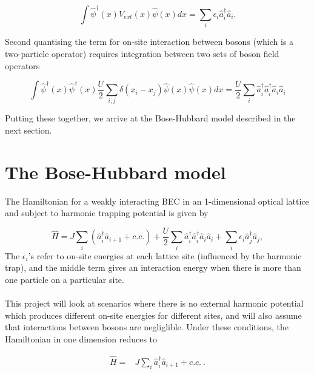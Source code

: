\documentclass[a4paper,10pt]{article}
\begin{document}
\begin{equation}
 \int  \hat{\psi}^{\dagger}(x) V_{ext}(x)  \hat{\psi}(x)dx = \sum_i \epsilon_i \hat{a}_i^{\dagger}\hat{a}_i.
\end{equation}

Second quantising the term for on-site interaction between bosons (which is a two-particle operator) requires integration between two sets of boson field operators

\begin{equation}
 \int  \hat{\psi}^{\dagger}(x)\hat{\psi}^{\dagger}(x) \frac{U}{2}\sum_{i,j}\delta(x_{i}-x_{j})  \hat{\psi}(x) \hat{\psi}(x) dx = \frac{U}{2}\sum_i \hat{a}_i^{\dagger}\hat{a}_i^{\dagger}\hat{a}_i\hat{a}_i
\end{equation}


Putting these together, we arrive at the Bose-Hubbard model described in the next section.
\newpage




\section{The Bose-Hubbard model}

The Hamiltonian for a weakly interacting BEC in an 1-dimensional optical lattice and subject to harmonic trapping potential is given by

\begin{equation}
 \hat{H}=J\sum_{i}(\hat{a}^\dagger_{i}\hat{a}_{i+1}+c.c.)+\frac{U}{2}\sum_{i}\hat{a}^\dagger_{i}\hat{a}^\dagger_{i}\hat{a}_{i}\hat{a}_{i}+\sum_{i}{\epsilon_i}\hat{a}^\dagger_{j}\hat{a}_{j},
\end{equation}
The $\epsilon_i$'s refer to on-site energies at each lattice site (influenced by the harmonic trap), and the middle term gives an interaction energy when there is more than one particle 
on a particular site.
\\\\
This project will look at scenarios where there is no external harmonic potential which produces different on-site energies for different sites, and will also 
assume that interactions between bosons are negliglible. Under these conditions, the Hamiltonian in one dimension reduces to

\begin{equation}
\begin{align*}
\hat{H}=&J\sum_{i}\hat{a}^\dagger_{i}\hat{a}_{i+1}+c.c.\ .
\end{align*}
\end{equation}
\end{document}
